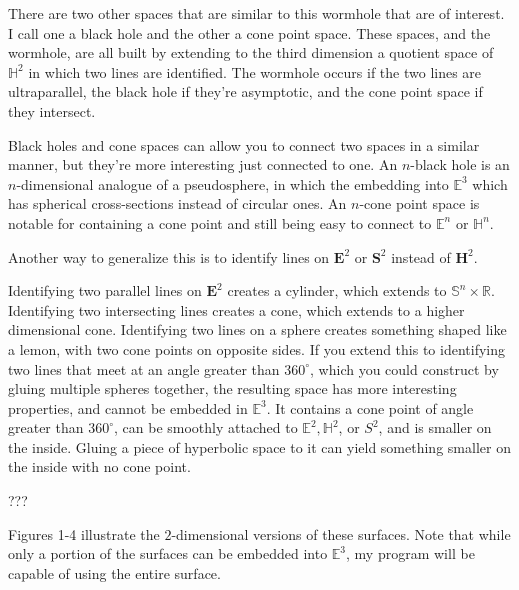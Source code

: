 \documentclass[12pt]{amsart}
\begin{document}
There are two other spaces that are similar to this wormhole that are of interest. I call one a black hole and the other a cone point space. These spaces, and the wormhole, are all built by extending to the third dimension a quotient space of $\mathbb{H}^2$ in which two lines are identified. The wormhole occurs if the two lines are ultraparallel, the black hole if they're asymptotic, and the cone point space if they intersect.

Black holes and cone spaces can allow you to connect two spaces in a similar manner, but they're more interesting just connected to one. An $n$-black hole is an $n$-dimensional analogue of a pseudosphere, in which the embedding into $\mathbb{E}^3$ which has spherical cross-sections instead of circular ones. An $n$-cone point space is notable for containing a cone point and still being easy to connect to $\mathbb{E}^n$ or $\mathbb{H}^n$.

Another way to generalize this is to identify lines on $\textbf{E}^2$ or $\textbf{S}^2$ instead of $\textbf{H}^2$.

Identifying two parallel lines on $\textbf{E}^2$ creates a cylinder, which extends to $\mathbb{S}^n \times \mathbb{R}$. Identifying two intersecting lines creates a cone, which extends to a higher dimensional cone. Identifying two lines on a sphere creates something shaped like a lemon, with two cone points on opposite sides. If you extend this to identifying two lines that meet at an angle greater than $360^\circ$, which you could construct by gluing multiple spheres together, the resulting space has more interesting properties, and cannot be embedded in $\mathbb{E}^3$.  It contains a cone point of angle greater than $360^\circ$, can be smoothly attached to $\mathbb{E}^2, \mathbb{H}^2$, or $S^2$, and is smaller on the inside. Gluing a piece of hyperbolic space to it can yield something smaller on the inside with no cone point.

???

Figures 1-4 illustrate the $2$-dimensional versions of these surfaces. Note that while only a portion of the surfaces can be embedded into $\mathbb{E}^3$, my program will be capable of using the entire surface.
\end{document}
